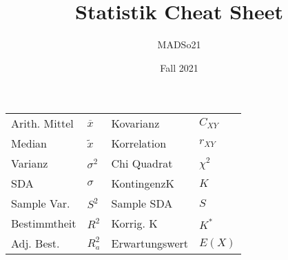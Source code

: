 \documentclass[a4paper]{article}
\title{Statistik Cheat Sheet}
\author{MADSo21}
\date{Fall 2021}
\begin{document}
\begin{landscape}
    \thispagestyle{empty}

    \begin{multicols}{4}
        \begin{center}
            \begin{tabular}{ll|ll}
                Arith. Mittel & $\overline{x}$  & Kovarianz &  $C_{XY}$\\
                Median      & $\widetilde{x}$ &  Korrelation     & $r_{XY}$  \\
                Varianz      & $\sigma^2$ &  Chi Quadrat     &  $\chi^2$\\
                SDA      &  $\sigma$&  KontingenzK    & $K$ \\
                Sample Var.& $S^2$& Sample SDA& $S$ \\
                Bestimmtheit& $R^2$&Korrig. K& $K^*$\\
                Adj. Best. & $R^2_a$& Erwartungswert& $E(X)$
                \end{tabular}
        \end{center}

\end{multicols}
\end{landscape}
\end{document}
